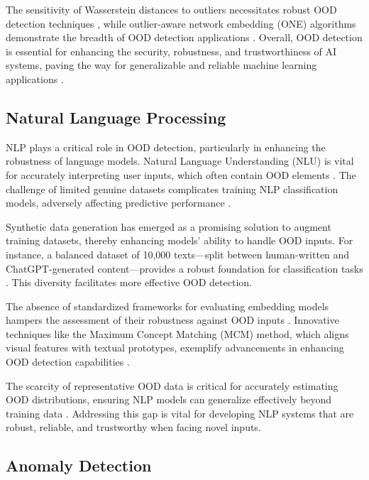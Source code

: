 The sensitivity of Wasserstein distances to outliers necessitates robust OOD detection techniques \cite{nietert2023outlierrobustoptimaltransportduality}, while outlier-aware network embedding (ONE) algorithms demonstrate the breadth of OOD detection applications \cite{bandyopadhyay2018outlierawarenetworkembedding}. Overall, OOD detection is essential for enhancing the security, robustness, and trustworthiness of AI systems, paving the way for generalizable and reliable machine learning applications \cite{baragatti2024approximatebayesiancomputationdeep}.

\subsection{Natural Language Processing} \label{subsec:NLP}

NLP plays a critical role in OOD detection, particularly in enhancing the robustness of language models. Natural Language Understanding (NLU) is vital for accurately interpreting user inputs, which often contain OOD elements \cite{Out-of-dom4}. The challenge of limited genuine datasets complicates training NLP classification models, adversely affecting predictive performance \cite{whitfield2021usinggpt2createsynthetic}.

Synthetic data generation has emerged as a promising solution to augment training datasets, thereby enhancing models' ability to handle OOD inputs. For instance, a balanced dataset of 10,000 texts—split between human-written and ChatGPT-generated content—provides a robust foundation for classification tasks \cite{islam2023distinguishinghumangeneratedtext}. This diversity facilitates more effective OOD detection.

The absence of standardized frameworks for evaluating embedding models hampers the assessment of their robustness against OOD inputs \cite{darrin2024embeddingmodelpromisinganother}. Innovative techniques like the Maximum Concept Matching (MCM) method, which aligns visual features with textual prototypes, exemplify advancements in enhancing OOD detection capabilities \cite{Delvingint2}.

The scarcity of representative OOD data is critical for accurately estimating OOD distributions, ensuring NLP models can generalize effectively beyond training data \cite{lang2023survey}. Addressing this gap is vital for developing NLP systems that are robust, reliable, and trustworthy when facing novel inputs.

\subsection{Anomaly Detection} \label{subsec:Anomaly Detection}

